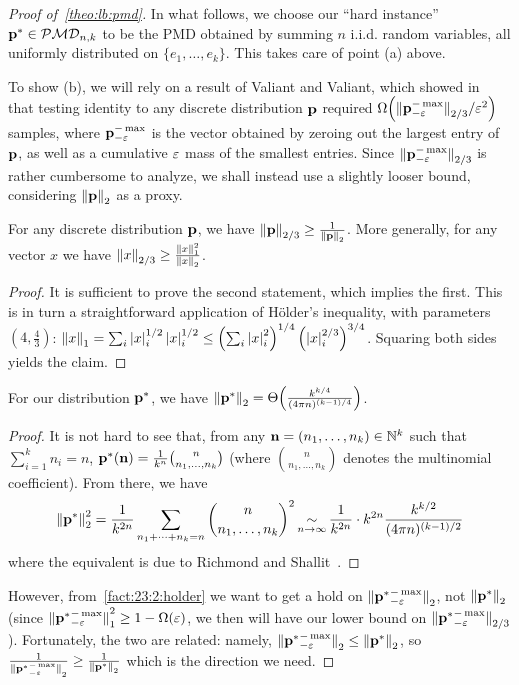 \begin{proof}[Proof of~\cref{theo:lb:pmd}]
In what follows, we choose our ``hard instance'' $\p^\ast\in\classpmd[n]{k}$ to be the PMD obtained by summing $n$ i.i.d. random variables, all uniformly distributed on $\{e_1,\dots,e_k\}$. This takes care of point (a) above.

To show (b), we will rely on a result of Valiant and Valiant, which showed in~\cite{VV:14} that testing identity to any discrete distribution $\p$ required $\bigOmega{\norm{\p^{-\max}_{-\eps}}_{2/3}/\eps^2}$ samples, where $\p^{-\max}_{-\eps}$ is the vector obtained by zeroing out the largest entry of $\p$, as well as a cumulative $\eps$ mass of the smallest entries. Since $\norm{\p^{-\max}_{-\eps}}_{2/3}$ is rather cumbersome to analyze, we shall instead use a slightly looser bound, considering $\normtwo{\p}$ as a proxy.
\begin{fact}\label{fact:23:2:holder}
For any discrete distribution $\p$, we have $\norm{\p}_{2/3} \geq \frac{1}{\normtwo{\p}}$. More generally, for any vector $x$ we have $\norm{x}_{2/3} \geq \frac{\normone{x}^2}{\normtwo{x}}$.
\end{fact}
\begin{proof}
It is sufficient to prove the second statement, which implies the first. This is in turn a straightforward application of H\"older's inequality, with parameters $(4,\frac{4}{3})$:
$
    \normone{x} = \sum_{i} \abs{x}_i^{1/2}\abs{x}_i^{1/2} \leq \left( \sum_{i} \abs{x}_i^{2}\right) ^{1/4} \left( \abs{x}_i^{2/3}\right)^{3/4}
$. Squaring both sides yields the claim.
\end{proof}
\begin{fact}
For our distribution $\p^\ast$, we have $\normtwo{\p^\ast} = \bigTheta{ \frac{k^{k/4}}{ (4\pi n)^{(k-1)/4}} }$.
\end{fact}
\begin{proof}
It is not hard to see that, from any $\mathbf{n}=(n_1,\dots,n_k)\in\N^k$ such that $\sum_{i=1}^k n_i = n$, $\p^\ast( \mathbf{n} ) = \frac{1}{k^n} \binom{n}{n_1,\dots,n_k}$ (where $\binom{n}{n_1,\dots,n_k}$ denotes the multinomial coefficient). From there, we have
\[
    \normtwo{\p^\ast}^2 = \frac{1}{k^{2n}}\sum_{n_1+\dots+n_k=n} \binom{n}{n_1,\dots,n_k}^2 \operatorname*{\sim}_{n\to\infty} \frac{1}{k^{2n}} \cdot k^{2n}\frac{k^{k/2}}{ (4\pi n)^{(k-1)/2}}
\]
where the equivalent is due to Richmond and Shallit~\cite{RS:08:numbertheory}.
\end{proof}
\noindent However, from~\cref{fact:23:2:holder} we want to get a hold on $\normtwo{{\p^\ast}^{-\max}_{-\eps}}$, not $\normtwo{\p^\ast}$ (since $\normone{{\p^\ast}^{-\max}_{-\eps}}^2 \geq 1-\Omega(\eps)$, we then will have our lower bound on $\norm{{\p^\ast}^{-\max}_{-\eps}}_{2/3}$). Fortunately, the two are related: namely, $\normtwo{{\p^\ast}^{-\max}_{-\eps}}\leq \normtwo{\p^\ast}$, so
$
    \frac{1}{\normtwo{{\p^\ast}^{-\max}_{-\eps}}} \geq \frac{1}{\normtwo{\p^\ast}}
$ which is the direction we need.


\end{proof}
